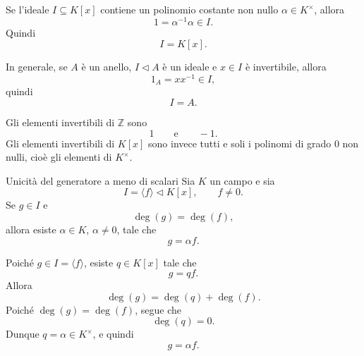 \documentclass[a4paper]{article}
\begin{document}
\begin{radioactive}
\begin{snippetremark}{}
    Se l'ideale \(I\subseteq K[x]\) contiene un polinomio costante non nullo \(\alpha \in K^\times\), allora
    \[
        1=\alpha^{-1}\alpha \in I.
    \]
    Quindi
    \[
        I=K[x].
    \]
\end{snippetremark}
\end{radioactive}

\begin{radioactive}
\begin{snippetremark}{}
    In generale, se \(A\) è un anello, \(I \triangleleft A\) è un ideale e \(x \in I\) è invertibile, allora
    \[
        1_A=xx^{-1}\in I,
    \]
    quindi
    \[
        I=A.
    \]
\end{snippetremark}
\end{radioactive}

\begin{radioactive}
\begin{snippetremark}{}
    Gli elementi invertibili di \(\mathbb{Z}\) sono
    \[
        1
        \qquad
        \text{e}
        \qquad
        -1.
    \]
    Gli elementi invertibili di \(K[x]\) sono invece tutti e soli i polinomi di grado \(0\) non nulli, cioè gli elementi di \(K^\times\).
\end{snippetremark}
\end{radioactive}

\begin{radioactive}
\begin{snippetproposition}{Unicità del generatore a meno di scalari}
    Sia \(K\) un campo e sia
    \[
        I=\langle f \rangle\triangleleft K[x],
        \qquad
        f\neq 0.
    \]
    Se \(g \in I\) e
    \[
        \deg(g)=\deg(f),
    \]
    allora esiste \(\alpha \in K\), \(\alpha\neq 0\), tale che
    \[
        g=\alpha f.
    \]
\end{snippetproposition}
\end{radioactive}

\begin{radioactive}
\begin{snippetproof}{}
    Poiché \(g \in I=\langle f \rangle\), esiste \(q \in K[x]\) tale che
    \[
        g=qf.
    \]
    Allora
    \[
        \deg(g)=\deg(q)+\deg(f).
    \]
    Poiché \(\deg(g)=\deg(f)\), segue che
    \[
        \deg(q)=0.
    \]
    Dunque \(q=\alpha\in K^\times\), e quindi
    \[
        g=\alpha f.
    \]
\end{snippetproof}
\end{radioactive}
\end{document}
